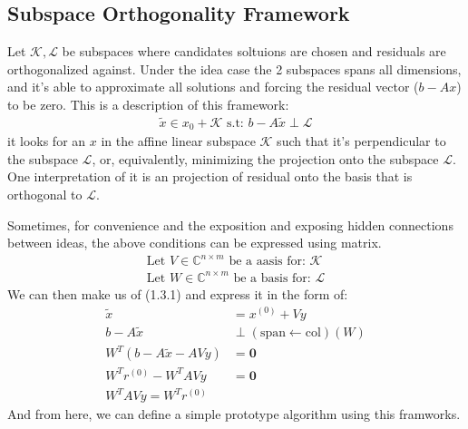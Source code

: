 \documentclass[]{article}
\theoremstyle{definition}
\begin{document}
    \subsection{Subspace Orthogonality Framework}
        Let $\mathcal K, \mathcal L$ be subspaces where candidates soltuions are chosen and residuals are orthogonalized against. Under the idea case the 2 subspaces spans all dimensions, and it's able to approximate all solutions and forcing the residual vector ($b - Ax$) to be zero. This is a description of this framework: 
        \begin{align}
            \tilde{x} \in x_0 + \mathcal{K} \text{ s.t: } b - A\tilde{x} \perp \mathcal{L}
        \end{align}
        it looks for an $x$ in the affine linear subspace $\mathcal{K}$ such that it's perpendicular to the subspace $\mathcal{L}$, or, equivalently, minimizing the projection onto the subspace $\mathcal{L}$. One interpretation of it is an projection of residual onto the basis that is orthogonal to $\mathcal L$. 
        \par
        Sometimes, for convenience and the exposition and exposing hidden connections between ideas, the above conditions can be expressed using matrix. 
        \begin{align}
            \text{Let } V \in \mathbb{C}^{n\times m} \text{ be a aasis for: }\mathcal{K}
            \\
            \text{Let } W \in \mathbb{C}^{n\times m} \text{ be a basis for: } \mathcal{L}
        \end{align}
        We can then make us of (1.3.1) and express it in the form of: 
        \begin{align}
            \tilde{x} &= x^{(0)} + Vy
            \\
            b - A\tilde{x}  &\perp (\text{span}\leftarrow \text{col})(W)
            \\
            W^T(b - A\tilde{x} - AVy) &= \mathbf{0}
            \\
            W^Tr^{(0)} - W^TAVy&= \mathbf{0}
            \\
            W^TAVy = W^Tr^{(0)}
        \end{align}
        And from here, we can define a simple prototype algorithm using this framworks. 
\end{document}
